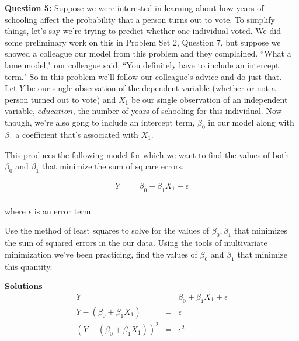 \documentclass[10pt]{amsart}
\begin{document}
\medskip

\noindent \textbf{Question 5:} Suppose we were interested in learning about how years of schooling affect the probability that a person turns out to vote. To simplify things, let's say we're trying to predict whether one individual voted. We did some preliminary work on this in Problem Set 2, Question 7, but suppose we showed a colleague our model from this problem and they complained. ``What a lame model," our colleague said, ``You definitely have to include an intercept term." So in this problem we'll follow our colleague's advice and do just that.\\

Let $Y$ be our single observation of the dependent variable (whether or not a person turned out to vote) and $X_1$ be our single observation of an independent variable, $education$, the number of years of schooling for this individual. Now though, we're also gong to include an intercept term, $\beta_0$ in our model along with $\beta_1$ a coefficient that's associated with $X_1$. 

This produces the following model for which we want to find the values of both $\beta_0$ and $\beta_1$ that minimize the sum of square errors. 

\bigskip
\begin{eqnarray*}
Y&=& \beta_0 + \beta_1 X_1 + \epsilon\\
 \end{eqnarray*}
 
 where $\epsilon$ is an error term.
 
 Use the method of least squares to solve for the values of $\beta_0, \beta_1$ that minimizes the sum of squared errors in the our data. Using the tools of multivariate minimization we've been practicing, find the values of $\beta_0$ and $\beta_1$ that minimize this quantity.
 
\textbf{Solutions}
 \begin{eqnarray*}
 Y&=& \beta_0 + \beta_1 X_1 + \epsilon\\
 Y - (\beta_0 + \beta_1 X_1) &=& \epsilon\\
 (Y - (\beta_0 + \beta_1 X_1) )^2 &=& \epsilon^2
 \end{eqnarray*}
 
\end{document}
